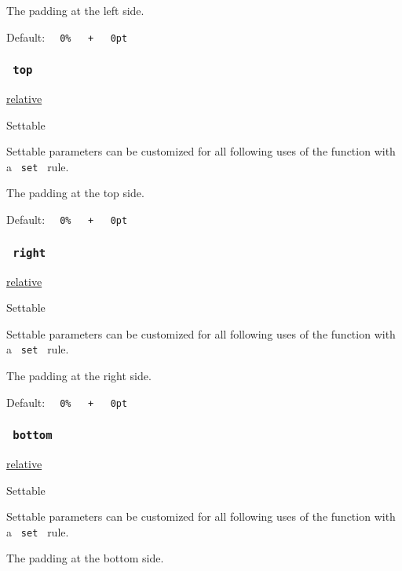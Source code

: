 The padding at the left side.

Default:
\texttt{\ }{\texttt{\ 0\%\ }}\texttt{\ }{\texttt{\ +\ }}\texttt{\ }{\texttt{\ 0pt\ }}\texttt{\ }

\subsubsection{\texorpdfstring{\texttt{\ top\ }}{ top }}\label{parameters-top}

\href{/docs/reference/layout/relative/}{relative}

{{ Settable }}

\label{parameters-top-settable-tooltip}
Settable parameters can be customized for all following uses of the
function with a \texttt{\ set\ } rule.

The padding at the top side.

Default:
\texttt{\ }{\texttt{\ 0\%\ }}\texttt{\ }{\texttt{\ +\ }}\texttt{\ }{\texttt{\ 0pt\ }}\texttt{\ }

\subsubsection{\texorpdfstring{\texttt{\ right\ }}{ right }}\label{parameters-right}

\href{/docs/reference/layout/relative/}{relative}

{{ Settable }}

\label{parameters-right-settable-tooltip}
Settable parameters can be customized for all following uses of the
function with a \texttt{\ set\ } rule.

The padding at the right side.

Default:
\texttt{\ }{\texttt{\ 0\%\ }}\texttt{\ }{\texttt{\ +\ }}\texttt{\ }{\texttt{\ 0pt\ }}\texttt{\ }

\subsubsection{\texorpdfstring{\texttt{\ bottom\ }}{ bottom }}\label{parameters-bottom}

\href{/docs/reference/layout/relative/}{relative}

{{ Settable }}

\label{parameters-bottom-settable-tooltip}
Settable parameters can be customized for all following uses of the
function with a \texttt{\ set\ } rule.

The padding at the bottom side.

